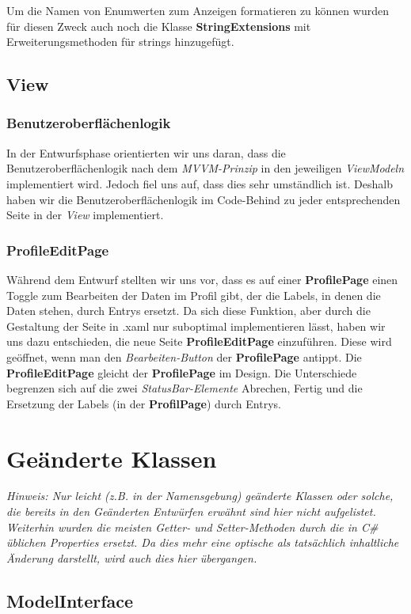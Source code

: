 \documentclass[a4paper]{scrreprt}
\begin{document}
Um die Namen von Enumwerten zum Anzeigen formatieren zu können wurden für diesen Zweck auch noch die Klasse \textbf{StringExtensions} mit Erweiterungsmethoden für strings hinzugefügt.

\subsection{View}
\subsubsection{Benutzeroberflächenlogik}
In der Entwurfsphase orientierten wir uns daran, dass die Benutzeroberflächenlogik nach dem \textit{MVVM-Prinzip} in den jeweiligen \textit{ViewModeln} implementiert wird. Jedoch fiel uns auf, dass dies sehr umständlich ist. Deshalb haben wir die Benutzeroberflächenlogik im Code-Behind zu jeder entsprechenden Seite in der \textit{View} implementiert.
\subsubsection{ProfileEditPage}
Während dem Entwurf stellten wir uns vor, dass es auf einer \textbf{ProfilePage} einen Toggle zum Bearbeiten der Daten im Profil gibt, der die Labels, in denen die Daten stehen, durch Entrys ersetzt. Da sich diese Funktion, aber durch die Gestaltung der Seite in .xaml nur suboptimal implementieren lässt, haben wir uns dazu entschieden, die neue Seite \textbf{ProfileEditPage} einzuführen. Diese wird geöffnet, wenn man den \textit{Bearbeiten-Button
} der \textbf{ProfilePage} antippt. Die \textbf{ProfileEditPage} gleicht der \textbf{ProfilePage} im Design. Die Unterschiede begrenzen sich auf die zwei \textit{StatusBar-Elemente} \dq{}Abrechen\dq{}, \dq{}Fertig\dq{} und die Ersetzung der Labels (in der \textbf{ProfilPage}) durch Entrys.

\section{Geänderte Klassen}
\textit{Hinweis: Nur leicht (z.B. in der Namensgebung) geänderte Klassen oder solche, die bereits in den Geänderten Entwürfen erwähnt sind hier nicht aufgelistet. Weiterhin wurden die meisten Getter- und Setter-Methoden durch die in C\# üblichen Properties ersetzt. Da dies mehr eine optische als tatsächlich inhaltliche Änderung darstellt, wird auch dies hier übergangen.}

\subsection{ModelInterface}
\end{document}
